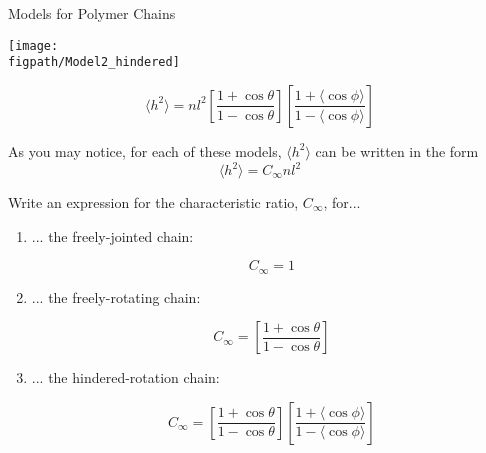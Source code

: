 \begin{activity}{Models for Polymer Chains}
\begin{model}
\begin{enumerate}
			\begin{minipage}[c]{0.45\textwidth}
				\centerline{\texttt{[image: \\figpath/Model2\_hindered]}}
			\end{minipage}\begin{minipage}[c]{0.45\textwidth}
				\begin{equation*}
					\langle h^2\rangle = n l^2 \left[\frac{1+\cos\theta}{1-\cos\theta}\right] \left[\frac{1+\langle \cos\phi\rangle}{1-\langle\cos\phi\rangle}\right]
				\end{equation*}
			\end{minipage}
			
	\end{enumerate}
	
\end{model}

\begin{ctqs}

	\question As you may notice, for each of these models, $\langle h^2\rangle$ can be written in the form \label{\labelbase:ctq:C}
		\begin{equation*}
			\langle h^2 \rangle = C_\infty n l^2
		\end{equation*}
		
		Write an expression for the characteristic ratio, $C_\infty$, for...
		
		\begin{enumerate}
			\item ... the freely-jointed chain:
	
		\begin{solution}[0.5in]
			\begin{equation*}
				C_\infty = 1
			\end{equation*}
		\end{solution}
			
			\item ... the freely-rotating chain:
	
		\begin{solution}[0.75in]
			\begin{equation*}
				C_\infty = \left[\frac{1+\cos\theta}{1-\cos\theta}\right]
			\end{equation*}
		\end{solution}
			
			\item ... the hindered-rotation chain:
	
		\begin{solution}[0.75in]
			\begin{equation*}
				C_\infty = \left[\frac{1+\cos\theta}{1-\cos\theta}\right] \left[\frac{1+\langle \cos\phi\rangle}{1-\langle\cos\phi\rangle}\right]
			\end{equation*}
		\end{solution}
		\end{enumerate}


\end{ctqs}
\end{activity}
